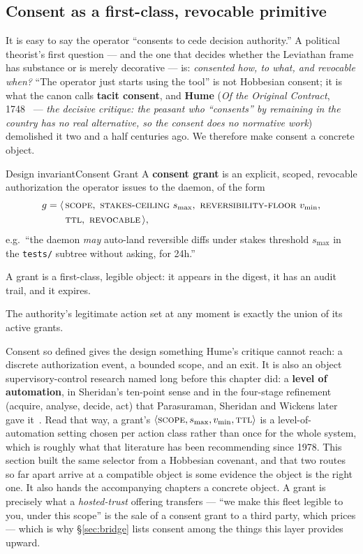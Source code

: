 \documentclass[11pt,a4paper]{article}
\theoremstyle{definition}
\theoremstyle{plain}
\begin{document}
\subsection{Consent as a first-class, revocable primitive}\label{sec:consent}
It is easy to say the operator ``consents to cede decision authority.'' A political
theorist's first question --- and the one that decides whether the Leviathan frame has
substance or is merely decorative --- is: \emph{consented how, to what, and revocable when?}
``The operator just starts using the tool'' is
not Hobbesian consent; it is what the canon calls \textbf{tacit consent}, and
\textbf{Hume} (\emph{Of the Original Contract}, 1748~ --- \emph{the
decisive critique: the peasant who ``consents'' by remaining in the country has no
real alternative, so the consent does no normative work}) demolished it two and a
half centuries ago. We therefore make consent a concrete object.
\begin{pdclaim}{Design invariant}{Consent Grant}
\setlength{\parskip}{4pt plus 1pt}
\label{def:consent}
A \textbf{consent grant} is an explicit, scoped, revocable authorization the
operator issues to the daemon, of the form
\[
\begin{aligned}
g = \langle\, &\textsc{scope},\ \textsc{stakes-ceiling}\ s_{\max},\ \textsc{reversibility-floor}\ v_{\min},\\
&\textsc{ttl},\ \textsc{revocable}\,\rangle,
\end{aligned}
\]
e.g.\ ``the daemon \emph{may} auto-land reversible diffs under stakes threshold
$s_{\max}$ in the \texttt{tests/} subtree without asking, for 24h.''

A grant is a
first-class, legible object: it appears in the digest, it has an audit trail, and it
expires.

The authority's legitimate action set at any moment is exactly the union of
its active grants.
\end{pdclaim}

Consent so defined gives the design something Hume's critique cannot reach: a
discrete authorization event, a bounded scope, and an exit. It is also an object
supervisory-control research named long before this chapter did: a
\textbf{level of automation}, in Sheridan's ten-point sense and in the
four-stage refinement (acquire, analyse, decide, act) that Parasuraman,
Sheridan and Wickens later gave it~. Read
that way, a grant's $\langle\textsc{scope}, s_{\max}, v_{\min},
\textsc{ttl}\rangle$ is a level-of-automation setting chosen per action class
rather than once for the whole system, which is roughly what that literature
has been recommending since 1978. This section built the same selector from a
Hobbesian covenant, and that two routes so far apart arrive at a compatible
object is some evidence the object is the right one. It also hands the
accompanying chapters a concrete object. A grant is precisely what a \emph{hosted-trust}
offering transfers --- ``we make this fleet legible to you, under this scope'' is
the sale of a consent grant to a third party, which 
prices --- which is why \S\ref{sec:bridge} lists consent among the things this layer
provides upward.
\end{document}
